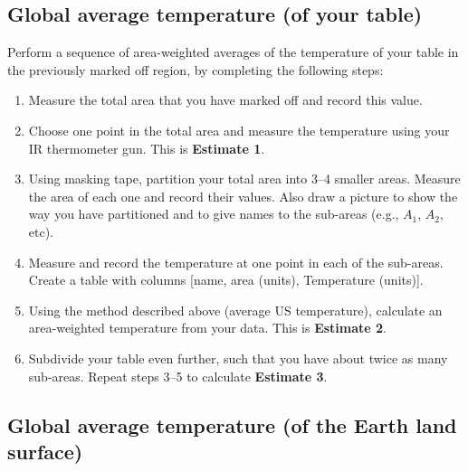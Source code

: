\subsection{Global average temperature (of your table)}

Perform a sequence of area-weighted averages of the temperature of your table in the previously marked off region, by completing the following steps:
	\begin{enumerate}
	\item Measure the total area that you have marked off and record this value.
	\item Choose one point in the total area and measure the temperature using your IR thermometer gun.  This is {\bf Estimate 1}.
	\item Using masking tape, partition your total area into 3--4 smaller areas.  Measure the area of each one and record their values.  Also draw a picture to show the way you have partitioned and to give names to the sub-areas (e.g., $A_1$, $A_2$, etc).  
	\item Measure and record the temperature at one point in each of the sub-areas. Create a table with columns [name, area (units),  Temperature (units)].
	\item Using the method described above (average US temperature), calculate an area-weighted temperature from your data. This is {\bf Estimate 2}.
	\item Subdivide your table even further, such that you have about twice as many sub-areas.  Repeat steps 3--5 to calculate {\bf Estimate 3}.
	\end{enumerate}


\subsection{Global average temperature (of the Earth land surface)}

